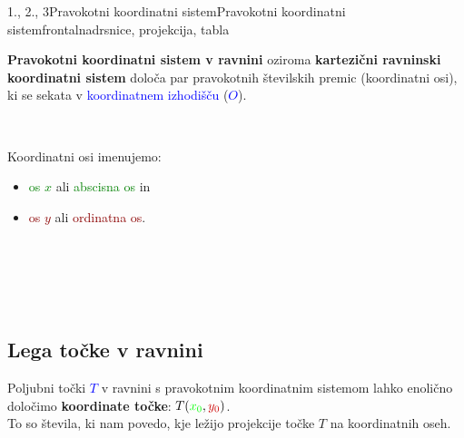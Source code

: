 \begin{priprava}{1., 2., 3}{}{Pravokotni koordinatni sistem}{Pravokotni koordinatni sistem}{frontalna}{drsnice, projekcija, tabla}
\begin{wrapfigure}{r}{0.43\textwidth}

    \end{wrapfigure}


    \textbf{Pravokotni koordinatni sistem v ravnini} oziroma  \textbf{kartezični ravninski koordinatni sistem} določa par pravokotnih številskih premic (koordinatni osi), ki se sekata v \textcolor{blue}{koordinatnem izhodišču} (\textcolor{blue}{$O$}). 

    ~

    Koordinatni osi imenujemo:
    \begin{itemize}
        \item \textcolor{green}{os $x$} ali \textcolor{green}{abscisna os} in
        \item \textcolor{darkred}{os $y$} ali \textcolor{darkred}{ordinatna os}.
    \end{itemize}
    
    
    

    ~\\~\\~\\~

\subsection*{Lega točke v ravnini}



    Poljubni točki \textcolor{blue}{$T$} v ravnini s pravokotnim koordinatnim sistemom lahko enolično določimo \textbf{koordinate točke}: \textcolor{blue}{$T(\textcolor{green}{x_0},\textcolor{darkred}{y_0})$}. \\
    To so števila, ki nam povedo, kje ležijo projekcije točke $T$ na koordinatnih oseh.


\end{priprava}
